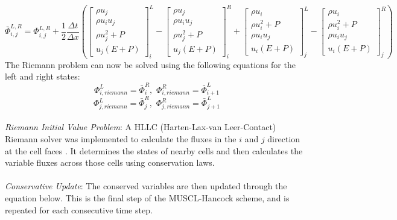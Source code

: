 \documentclass{homework}
\begin{document}
\begin{equation*}
    \bar \Phi_{i,j}^{L,R} = \Phi_{i,j}^{L,R} + \frac{1}{2} \frac{\Delta t}{\Delta x}\left( \begin{bmatrix}
    \rho u_j \\[4pt]
    \rho u_i u_j \\[4pt]
    \rho u_j^2 + P \\[4pt]
    u_j(E + P)
    \end{bmatrix}_i^L - \begin{bmatrix}
    \rho u_j \\[4pt]
    \rho u_i u_j \\[4pt]
    \rho u_j^2 + P \\[4pt]
    u_j(E + P)
    \end{bmatrix}_i^R + \begin{bmatrix}
    \rho u_i \\[4pt]
    \rho u_i^2 + P \\[4pt]
    \rho u_i u_j \\[4pt]
    u_i(E + P)
    \end{bmatrix}_j^L - \begin{bmatrix}
    \rho u_i \\[4pt]
    \rho u_i^2 + P \\[4pt]
    \rho u_i u_j \\[4pt]
    u_i(E + P)
    \end{bmatrix}_j^R \right)
\end{equation*}
The Riemann problem can now be solved using the following equations for the left and right states:
\begin{equation*}
    \Phi_{i,riemann}^L = \bar \Phi_i^R, \,\, \Phi_{i,riemann}^R = \bar \Phi_{i+1}^L
\end{equation*}
\begin{equation*}
    \Phi_{j,riemann}^L = \bar \Phi_j^R, \,\, \Phi_{j,riemann}^R = \bar \Phi_{j+1}^L
\end{equation*}
\\
\noindent \emph{Riemann Initial Value Problem}: A HLLC (Harten-Lax-van Leer-Contact) Riemann solver was implemented to calculate the fluxes in the $i$ and $j$ direction at the cell faces \cite{Toro2009}. It determines the states of nearby cells and then calculates the variable fluxes across those cells using conservation laws.
\\ \\ \noindent
\emph{Conservative Update}: The conserved variables are then updated through the equation below. This is the final step of the MUSCL-Hancock scheme, and is repeated for each consecutive time step.
\end{document}
